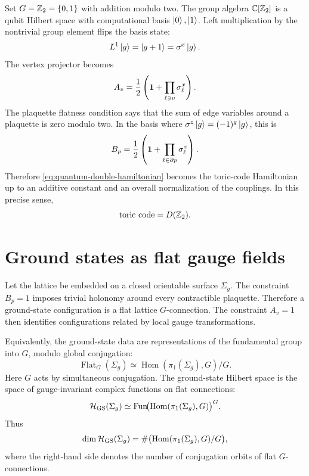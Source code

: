 Set \(G=\mathbb{Z}_2=\{0,1\}\) with addition modulo two.  The group algebra
\(\mathbb{C}[\mathbb{Z}_2]\) is a qubit Hilbert space with computational basis
\(\left|0\right\rangle,\left|1\right\rangle\).  Left multiplication by the nontrivial group element flips
the basis state:
\begin{equation}
\label{eq:z2-left-multiplication-sigma-x}
    L^1\left|g\right\rangle=\left|g+1\right\rangle=\sigma^x\left|g\right\rangle .
\end{equation}
The vertex projector becomes
\begin{equation}
\label{eq:z2-vertex-projector-toric-code}
    A_v
    =\frac{1}{2}\left(\mathbf{1}+\prod_{\ell\ni v}\sigma^x_{\ell}\right).
\end{equation}
The plaquette flatness condition says that the sum of edge variables around a
plaquette is zero modulo two.  In the basis where
\(\sigma^z\left|g\right\rangle=(-1)^g\left|g\right\rangle\), this is
\begin{equation}
\label{eq:z2-plaquette-projector-toric-code}
    B_p
    =\frac{1}{2}\left(\mathbf{1}+\prod_{\ell\in\partial p}\sigma^z_{\ell}\right).
\end{equation}
Therefore \cref{eq:quantum-double-hamiltonian} becomes the toric-code
Hamiltonian up to an additive constant and an overall normalization of the
couplings.  In this precise sense,
\begin{equation}
\label{eq:toric-code-as-dz2}
    \text{toric code}=D(\mathbb{Z}_2) .
\end{equation}

\section{Ground states as flat gauge fields}
\label{sec:quantum-double-ground-states-flat-connections}

Let the lattice be embedded on a closed orientable surface \(\Sigma_g\).  The
constraint \(B_p=1\) imposes trivial holonomy around every contractible
plaquette.  Therefore a ground-state configuration is a flat lattice
\(G\)-connection.  The constraint \(A_v=1\) then identifies configurations
related by local gauge transformations.

Equivalently, the ground-state data are representations of the fundamental
group into \(G\), modulo global conjugation:
\begin{equation}
\label{eq:flat-g-connections-moduli}
    \operatorname{Flat}_G(\Sigma_g)
    \simeq
    \operatorname{Hom}(\pi_1(\Sigma_g),G)/G .
\end{equation}
Here \(G\) acts by simultaneous conjugation.  The ground-state Hilbert space is
the space of gauge-invariant complex functions on flat connections:
\begin{equation}
\label{eq:quantum-double-ground-space-functions}
    \mathcal{H}_{\rm GS}(\Sigma_g)
    \simeq
    \operatorname{Fun}\!\bigl(\operatorname{Hom}(\pi_1(\Sigma_g),G)\bigr)^G .
\end{equation}
Thus
\begin{equation}
\label{eq:quantum-double-ground-degeneracy-orbits}
    \dim \mathcal{H}_{\rm GS}(\Sigma_g)
    =
    \#\bigl(\operatorname{Hom}(\pi_1(\Sigma_g),G)/G\bigr),
\end{equation}
where the right-hand side denotes the number of conjugation orbits of flat
\(G\)-connections.


